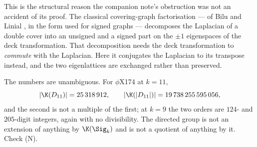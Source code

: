 This is the structural reason the companion note's obstruction was not an accident of its
proof. The classical covering-graph factorisation --- of Bilu and Linial \cite{BL06}, in the
form used for signed graphs --- decomposes the Laplacian of a double cover into an unsigned
and a signed part on the $\pm1$ eigenspaces of the deck transformation. That decomposition
needs the deck transformation to \emph{commute} with the Laplacian. Here it conjugates the
Laplacian to its transpose instead, and the two eigenlattices are exchanged rather than
preserved.

The numbers are unambiguous. For $\phi$X174 at $k=11$,
\[
  |\K(D_{11})| = 25\,318\,912 ,\qquad
  |\K(|D_{11}|)| = 19\,738\,255\,595\,056 ,
\]
and the second is not a multiple of the first; at $k=9$ the two orders are $124$- and
$205$-digit integers, again with no divisibility. The directed group is not an extension of
anything by $\K(\Sig_k)$ and is not a quotient of anything by it. Check (N).

